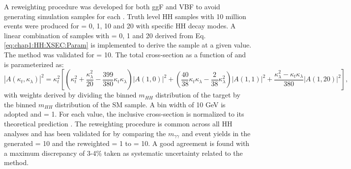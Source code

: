 A reweighting procedure was developed for both ggF and VBF to avoid generating simulation samples for each \kl. Truth level HH samples with 10 million events were produced for \kl= 0, 1, 10 and 20 with specific HH decay modes. A linear combination of samples with \kl= 0, 1 and 20 derived from Eq. \ref{eq:chap1:HH:XSEC:Param} is implemented to derive the sample at a given \kl value. The method was validated for \kl= 10. The total cross-section as a function of \kl and \kt is parameterized as:
\begin{equation}
    \left|A\left(\kappa_{t}, \kappa_{\lambda}\right)\right|^{2}=\kappa_{t}^{2}\left[\left(\kappa_{t}^{2}+\frac{\kappa_{\lambda}^{2}}{20}-\frac{399}{380} \kappa_{t} \kappa_{\lambda}\right)|A(1,0)|^{2}+\left(\frac{40}{38} \kappa_{t} \kappa_{\lambda}-\frac{2}{38} \kappa_{\lambda}^{2}\right)|A(1,1)|^{2}+\frac{\kappa_{\lambda}^{2}-\kappa_{t} \kappa_{\lambda}}{380}|A(1,20)|^{2}\right],
\end{equation}
with weights derived by dividing the binned $m_{HH}$ distribution of the target \kl by the binned $m_{HH}$ distribution of the SM sample. A bin width of 10 GeV is adopted and \kt= 1. For each \kl value, the inclusive cross-section is normalized to its theoretical prediction \cite{LHE}. The reweighting procedure is common across all HH analyses and has been validated for \HHyybb by comparing the $m_{\gamma\gamma}$ and event yields in the generated \kl= 10 and the reweighted \kl= 1 to \kl= 10. A good agreement is found with a maximum discrepancy of 3-4\% taken as systematic uncertainty related to the method.  \\ 

